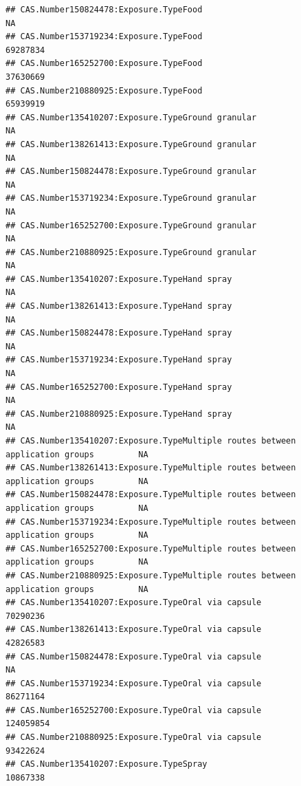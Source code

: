 \documentclass[
  12pt,
]{article}
\begin{document}
\begin{verbatim}
## CAS.Number150824478:Exposure.TypeFood                                               NA
## CAS.Number153719234:Exposure.TypeFood                                         69287834
## CAS.Number165252700:Exposure.TypeFood                                         37630669
## CAS.Number210880925:Exposure.TypeFood                                         65939919
## CAS.Number135410207:Exposure.TypeGround granular                                    NA
## CAS.Number138261413:Exposure.TypeGround granular                                    NA
## CAS.Number150824478:Exposure.TypeGround granular                                    NA
## CAS.Number153719234:Exposure.TypeGround granular                                    NA
## CAS.Number165252700:Exposure.TypeGround granular                                    NA
## CAS.Number210880925:Exposure.TypeGround granular                                    NA
## CAS.Number135410207:Exposure.TypeHand spray                                         NA
## CAS.Number138261413:Exposure.TypeHand spray                                         NA
## CAS.Number150824478:Exposure.TypeHand spray                                         NA
## CAS.Number153719234:Exposure.TypeHand spray                                         NA
## CAS.Number165252700:Exposure.TypeHand spray                                         NA
## CAS.Number210880925:Exposure.TypeHand spray                                         NA
## CAS.Number135410207:Exposure.TypeMultiple routes between application groups         NA
## CAS.Number138261413:Exposure.TypeMultiple routes between application groups         NA
## CAS.Number150824478:Exposure.TypeMultiple routes between application groups         NA
## CAS.Number153719234:Exposure.TypeMultiple routes between application groups         NA
## CAS.Number165252700:Exposure.TypeMultiple routes between application groups         NA
## CAS.Number210880925:Exposure.TypeMultiple routes between application groups         NA
## CAS.Number135410207:Exposure.TypeOral via capsule                             70290236
## CAS.Number138261413:Exposure.TypeOral via capsule                             42826583
## CAS.Number150824478:Exposure.TypeOral via capsule                                   NA
## CAS.Number153719234:Exposure.TypeOral via capsule                             86271164
## CAS.Number165252700:Exposure.TypeOral via capsule                            124059854
## CAS.Number210880925:Exposure.TypeOral via capsule                             93422624
## CAS.Number135410207:Exposure.TypeSpray                                        10867338

\end{verbatim}
\end{document}
